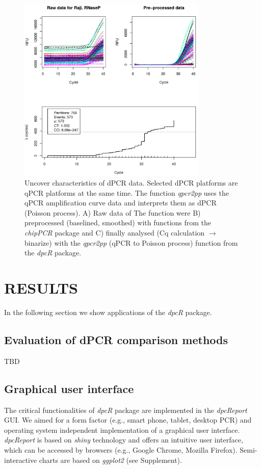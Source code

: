 \documentclass[a4,center,fleqn]{NAR}
\begin{document}
\begin{figure}[t]
\begin{center}
\includegraphics[width=9cm]{qpcr2pp_1.png}
\end{center}
\caption{Uncover characteristics of dPCR data. Selected dPCR platforms are qPCR 
platforms at the same time. The function \textit{qpcr2pp} uses the qPCR 
amplification curve data and interprets them as dPCR (Poisson process). A) Raw 
data of The function were B) preprocessed (baselined, smoothed) with functions 
from the \textit{chipPCR} package and C) finally analysed (Cq calculation 
$\rightarrow$ binarize) with the \textit{qpcr2pp} (qPCR to Poisson process) 
function from the \textit{dpcR} package.} 
\label{qpcr2pp_1}
\end{figure}

\section{RESULTS}

In the following section we show applications of the \textit{dpcR} package.

\subsection{Evaluation of dPCR comparison methods}

TBD

\subsection{Graphical user interface}

The critical functionalities of \textit{dpcR} package are implemented in the 
\textit{dpcReport} GUI. We aimed for a form factor (e.g., smart phone, tablet, 
desktop PCR) and operating system independent implementation of a graphical 
user 
interface. \textit{dpcReport} is based on \textit{shiny} technology and offers 
an intuitive user interface, which can be accessed by browsers (e.g., Google 
Chrome, Mozilla Firefox). Semi-interactive charts are based on \textit{ggplot2} 
(see Supplement).
\end{document}
